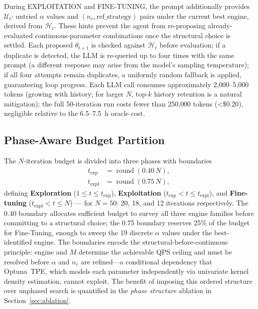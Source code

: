 \documentclass[sigconf, nonacm]{acmart}
\theoremstyle{definition}
\begin{document}
During EXPLOITATION and FINE-TUNING, the prompt additionally provides
$\mathcal{U}_t$: untried $\alpha$ values and $(n_r, \mathrm{ref\_strategy})$ pairs
under the current best engine, derived from $\mathcal{H}_t$.
These hints prevent the agent from re-proposing already-evaluated
continuous-parameter combinations once the structural choice is settled.
Each proposed $\theta_{t+1}$ is checked against $\mathcal{H}_t$ before evaluation;
if a duplicate is detected, the LLM is re-queried up to four times with the same prompt
(a different response may arise from the model's sampling temperature);
if all four attempts remain duplicates, a uniformly random fallback is applied,
guaranteeing loop progress.
Each LLM call consumes approximately 2{,}000--5{,}000 tokens (growing with history; for larger $N$, top-$k$ history retention is a natural mitigation); the full 50-iteration run costs fewer than 250{,}000 tokens (\textless\$0.20), negligible relative to the 6.5--7.5~h oracle cost.

\subsection{Phase-Aware Budget Partition}
\label{sec:phases}

The $N$-iteration budget is divided into three phases with boundaries
\begin{align}
  t_{\mathrm{exp}}  &= \operatorname{round}(0.40\,N), \label{eq:texp}\\
  t_{\mathrm{expl}} &= \operatorname{round}(0.75\,N), \label{eq:texpl}
\end{align}
defining \textbf{Exploration} ($1 \leq t \leq t_{\mathrm{exp}}$),
\textbf{Exploitation} ($t_{\mathrm{exp}} < t \leq t_{\mathrm{expl}}$),
and \textbf{Fine-tuning} ($t_{\mathrm{expl}} < t \leq N$) --- for $N{=}50$:
20, 18, and 12 iterations respectively.
The 0.40 boundary allocates sufficient budget to survey all three engine families
before committing to a structural choice; the 0.75 boundary reserves 25\% of the
budget for Fine-Tuning, enough to sweep the 19 discrete $\alpha$ values under
the best-identified engine.
The boundaries encode the structural-before-continuous principle: engine and $M$
determine the achievable QPS ceiling and must be resolved before $\alpha$ and $n_r$
are refined---a conditional dependency that Optuna~TPE, which models each parameter
independently via univariate kernel density estimation, cannot exploit.
The benefit of imposing this ordered structure over unphased search is quantified
in the \emph{phase structure} ablation in Section~\ref{sec:ablation}.
\end{document}
